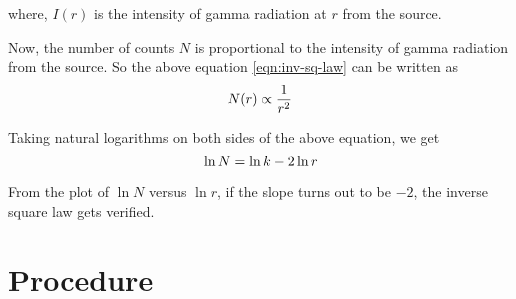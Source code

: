 	where, $ I(r) $ is the intensity of gamma radiation at $ r $ from the source. 
	
	Now, the number of counts $ N $ is proportional to the intensity of gamma radiation from the source. So the above equation \ref{eqn:inv-sq-law} can be written as
	\begin{equation}{\label{eqn:inv-sq-law-N}}
		N(r) \propto \dfrac{1}{r^2}
	\end{equation}

	Taking natural logarithms on both sides of the above equation, we get
	\begin{equation}{\label{eqn:log-eqn}}
		\ln N = \ln k - 2\ln r
	\end{equation}
	
	From the plot of $ \ln N $ versus $ \ln r $, if the slope turns out to be $ -2 $, the inverse square law gets verified.
	
	\section{Procedure}
	
